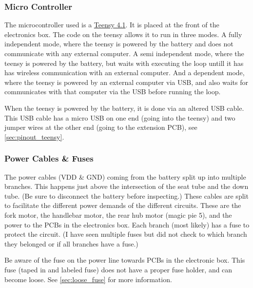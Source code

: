 \subsubsection{Micro Controller}
The microcontroller used is a \href{https://www.pjrc.com/store/teensy41.html}{Teensy 4.1}.
It is placed at the front of the electronics box.
The code on the teensy allows it to run in three modes.
A fully independent mode, where the teensy is powered by the battery and does not communicate with any external computer.
A semi independent mode, where the teensy is powered by the battery, but waits with executing the loop untill it has has wireless communication with an external computer.
And a dependent mode, where the teensy is powered by an external computer via USB, and also waits for communicates with that computer via the USB before running the loop.

When the teensy is powered by the battery, it is done via an altered USB cable.
This USB cable has a micro USB on one end (going into the teensy) and two jumper wires at the other end (going to the extension PCB), see \autoref{sec:pinout_teensy}.

\subsubsection{Power Cables \& Fuses}
The power cables (VDD \& GND) coming from the battery split up into multiple branches.
This happens just above the intersection of the seat tube and the down tube.
(Be sure to disconnect the battery before inspecting.)
These cables are split to facilitate the different power demands of the different circuits.
These are the fork motor, the handlebar motor, the rear hub motor (magic pie 5), and the power to the PCBs in the electronics box.
Each branch (most likely) has a fuse to protect the circuit.
(I have seen multiple fuses but did not check to which branch they belonged or if all branches have a fuse.)

Be aware of the fuse on the power line towards PCBs in the electronic box. 
This fuse (taped in and labeled fuse) does not have a proper fuse holder, and can become loose.
See \autoref{sec:loose_fuse} for more information.